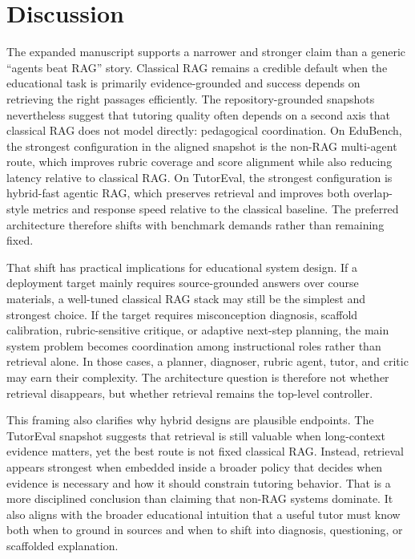 \section{Discussion}

The expanded manuscript supports a narrower and stronger claim than a generic ``agents beat RAG'' story. Classical RAG remains a credible default when the educational task is primarily evidence-grounded and success depends on retrieving the right passages efficiently. The repository-grounded snapshots nevertheless suggest that tutoring quality often depends on a second axis that classical RAG does not model directly: pedagogical coordination. On EduBench, the strongest configuration in the aligned snapshot is the non-RAG multi-agent route, which improves rubric coverage and score alignment while also reducing latency relative to classical RAG. On TutorEval, the strongest configuration is hybrid-fast agentic RAG, which preserves retrieval and improves both overlap-style metrics and response speed relative to the classical baseline. The preferred architecture therefore shifts with benchmark demands rather than remaining fixed.

That shift has practical implications for educational system design. If a deployment target mainly requires source-grounded answers over course materials, a well-tuned classical RAG stack may still be the simplest and strongest choice. If the target requires misconception diagnosis, scaffold calibration, rubric-sensitive critique, or adaptive next-step planning, the main system problem becomes coordination among instructional roles rather than retrieval alone. In those cases, a planner, diagnoser, rubric agent, tutor, and critic may earn their complexity. The architecture question is therefore not whether retrieval disappears, but whether retrieval remains the top-level controller.

This framing also clarifies why hybrid designs are plausible endpoints. The TutorEval snapshot suggests that retrieval is still valuable when long-context evidence matters, yet the best route is not fixed classical RAG. Instead, retrieval appears strongest when embedded inside a broader policy that decides when evidence is necessary and how it should constrain tutoring behavior. That is a more disciplined conclusion than claiming that non-RAG systems dominate. It also aligns with the broader educational intuition that a useful tutor must know both when to ground in sources and when to shift into diagnosis, questioning, or scaffolded explanation.

